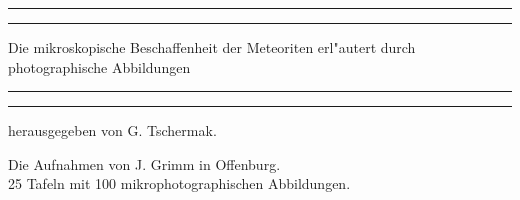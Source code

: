 \documentclass[a4paper, 11pt, oneside, polutonikogreek, german]{article}
\begin{document}
\begin{titlepage} %
	\centering %
	\scshape %

	
	\rule{\textwidth}{1.6pt}\vspace*{-\baselineskip}\vspace*{2pt} %
	\rule{\textwidth}{0.4pt} %
	
	\vspace{0.75\baselineskip} %

        {\LARGE Die mikroskopische Beschaffenheit der Meteoriten erl"autert durch photographische Abbildungen} %
	
	\vspace{0.75\baselineskip} %
	
	\rule{\textwidth}{0.4pt}\vspace*{-\baselineskip}\vspace{3.2pt} %
	\rule{\textwidth}{1.6pt} %
	
	\vspace{1\baselineskip} %
	
	
	{herausgegeben von G. Tschermak.} %
	
	\vspace*{1\baselineskip} %
	

 	{\small Die Aufnahmen von J. Grimm in Offenburg.\\ 25 Tafeln mit 100 mikrophotographischen Abbildungen.} %

	\vspace{1\baselineskip} %

	
	

\end{titlepage}
\end{document}
